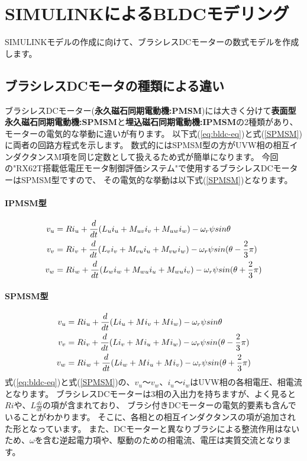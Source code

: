 \newpage
\section{SIMULINKによるBLDCモデリング}
SIMULINKモデルの作成に向けて、ブラシレスDCモーターの数式モデルを作成します。
\subsection{ブラシレスDCモータの種類による違い}
ブラシレスDCモーター({\bf 永久磁石同期電動機:PMSM})には大きく分けて{\bf 表面型永久磁石同期電動機:SPMSM}と{\bf 埋込磁石同期電動機:IPMSM}の2種類があり、モーターの電気的な挙動に違いが有ります。
以下式(\ref{eq:bldc-eq})と式(\ref{SPMSM})に両者の回路方程式を示します。
数式的にはSPMSM型の方がUVW相の相互インダクタンスM項を同じ定数として扱えるため式が簡単になります。
今回の"RX62T搭載低電圧モータ制御評価システム"で使用するブラシレスDCモーターはSPMSM型ですので、
その電気的な挙動は以下式(\ref{SPMSM})となります。
\paragraph{IPMSM型}
{\large
\begin{align}
v_{u} &= Ri_{u} + \frac{d}{dt} (L_{u}i_{u} + M_{uv}i_{v} + M_{uw}i_{w}) - \omega_{r} \psi sin\theta \notag \\
v_{v} &= Ri_{v} + \frac{d}{dt} (L_{v}i_{v} + M_{vu}i_{u} + M_{vw}i_{w}) - \omega_{r} \psi sin(\theta - \frac{2}{3}\pi) \notag \\
v_{w} &= Ri_{w} + \frac{d}{dt} (L_{w}i_{w} + M_{wu}i_{u} + M_{wu}i_{v}) - \omega_{r} \psi sin(\theta + \frac{2}{3}\pi) \label{eq:bldc-eq}
\end{align}
}
\paragraph{SPMSM型}
{\large
\begin{align}
v_{u} &= Ri_{u} + \frac{d}{dt} (Li_{u} + Mi_{v} + Mi_{w}) - \omega_{r} \psi sin\theta \notag \\
v_{v} &= Ri_{v} + \frac{d}{dt} (Li_{v} + Mi_{u} + Mi_{w}) - \omega_{r} \psi sin(\theta - \frac{2}{3}\pi) \notag \\
v_{w} &= Ri_{w} + \frac{d}{dt} (Li_{w} + Mi_{u} + Mi_{v}) - \omega_{r} \psi sin(\theta + \frac{2}{3}\pi) \label{SPMSM}
\end{align}
}
式(\ref{eq:bldc-eq})と式(\ref{SPMSM})の、$v_{u}〜v_{w}$、$i_{u}〜i_{w}$はUVW相の各相電圧、相電流となります。
ブラシレスDCモーターは3相の入出力を持ちますが、よく見ると$Riや、L\frac{di}{dt}$の項が含まれており、
ブラシ付きDCモーターの電気的要素も含んでいることがわかります。
そこに、各相との相互インダクタンスの項が追加された形となっています。
また、DCモーターと異なりブラシによる整流作用はないため、$\omega$を含む逆起電力項や、駆動のための相電流、電圧は実質交流となります。


